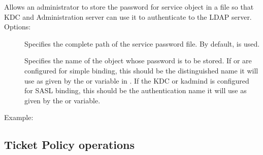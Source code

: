 \documentclass[letterpaper,10pt,english]{sphinxmanual}
\begin{document}
Allows an administrator to store the password for service object in a
file so that KDC and Administration server can use it to authenticate
to the LDAP server.  Options:
\begin{description}
\item[{ }] \leavevmode
Specifies the complete path of the service password file. By
default,  is used.

\item[{}] \leavevmode
Specifies the name of the object whose password is to be stored.
If {\hyperref[\detokenize{admin/admin_commands/krb5kdc:krb5kdc-8}]{}} or {\hyperref[\detokenize{admin/admin_commands/kadmind:kadmind-8}]{}} are configured for
simple binding, this should be the distinguished name it will
use as given by the  or 
variable in {\hyperref[\detokenize{admin/conf_files/kdc_conf:kdc-conf-5}]{}}.  If the KDC or kadmind is
configured for SASL binding, this should be the authentication
name it will use as given by the  or
 variable.

\end{description}

Example:

%
\begin{sphinxVerbatim}[commandchars=\\\{\}]
   
  
   
\end{sphinxVerbatim}


\subsection{Ticket Policy operations}
\label{\detokenize{admin/database:ticket-policy-operations}}
\end{document}
